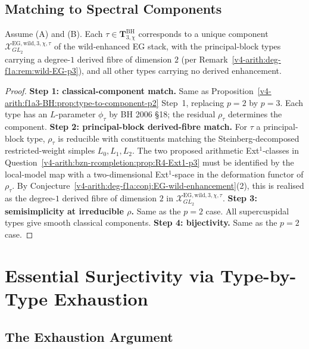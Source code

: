 \subsection{Matching to Spectral Components}

\begin{proposition}[type-to-component match at \(p=3\)]
\label{v4-arith:f1a3-BH:prop:type-to-component-p3}
Assume (A) and (B). Each
\(\tau\in\mathbf{T}^{\mathrm{BH}}_{3,\chi}\) corresponds to a unique
component \(\mathcal{X}^{\mathrm{EG,wild},3,\chi,\tau}_{GL_{2}}\) of the
wild-enhanced EG stack, with the principal-block types carrying a
degree-\(1\) derived fibre of dimension \(2\) (per
Remark~\ref{v4-arith:deg-f1a:rem:wild-EG-p3}), and all other types carrying
no derived enhancement.
\end{proposition}

\begin{proof}
\textbf{Step 1: classical-component match.} Same as
Proposition~\ref{v4-arith:f1a3-BH:prop:type-to-component-p2} Step~1,
replacing \(p=2\) by \(p=3\). Each type has an \(L\)-parameter
\(\phi_{\tau}\) by BH 2006 \S 18; the residual \(\rho_{\tau}\)
determines the component.
\textbf{Step 2: principal-block derived-fibre match.} For \(\tau\) a
principal-block type, \(\rho_{\tau}\) is reducible with constituents
matching the Steinberg-decomposed restricted-weight simples
\(L_{0},L_{1},L_{2}\). The two proposed arithmetic Ext\({}^{1}\)-classes in
Question~\ref{v4-arith:bzn-rcompletion:prop:R4-Ext1-p3} must be identified by the local-model map with a
two-dimensional Ext\({}^{1}\)-space in the deformation functor of
\(\rho_{\tau}\). By Conjecture~\ref{v4-arith:deg-f1a:conj:EG-wild-enhancement}(2),
this is realised as the degree-\(1\) derived fibre of dimension \(2\) in
\(\mathcal{X}^{\mathrm{EG,wild},3,\chi,\tau}_{GL_{2}}\).
\textbf{Step 3: semisimplicity at irreducible \(\rho\).} Same as the
\(p=2\) case. All supercuspidal types give smooth classical components.
\textbf{Step 4: bijectivity.} Same as the \(p=2\) case.
\end{proof}

\section{Essential Surjectivity via Type-by-Type Exhaustion}
\label{v4-arith:f1a3-BH:essential-surjectivity}

\subsection{The Exhaustion Argument}

